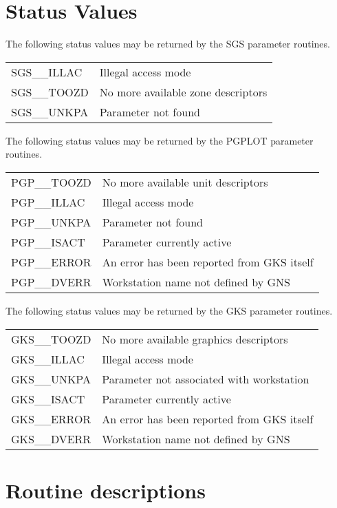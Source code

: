 \documentclass[twoside,11pt,nolof]{starlink}
\begin{document}
\section{Status Values}
\label{errs}
The following status values may be returned by the SGS parameter
routines.

\begin{tabular}{ll}
SGS\_\_ILLAC     & Illegal access mode \\
SGS\_\_TOOZD     & No more available zone descriptors \\
SGS\_\_UNKPA     & Parameter not found \\
\end{tabular}

The following status values may be returned by the PGPLOT parameter
routines.

\begin{tabular}{ll}
PGP\_\_TOOZD     & No more available unit descriptors \\
PGP\_\_ILLAC     & Illegal access mode \\
PGP\_\_UNKPA     & Parameter not found \\
PGP\_\_ISACT     & Parameter currently active \\
PGP\_\_ERROR     & An error has been reported from GKS itself \\
PGP\_\_DVERR     & Workstation name not defined by GNS
\end{tabular}

The following status values may be returned by the GKS parameter
routines.

\begin{tabular}{ll}
GKS\_\_TOOZD     & No more available graphics descriptors \\
GKS\_\_ILLAC     & Illegal access mode \\
GKS\_\_UNKPA     & Parameter not associated with workstation \\
GKS\_\_ISACT     & Parameter currently active \\
GKS\_\_ERROR     & An error has been reported from GKS itself \\
GKS\_\_DVERR     & Workstation name not defined by GNS
\end{tabular}
\newpage

\section{Routine descriptions}
\end{document}
